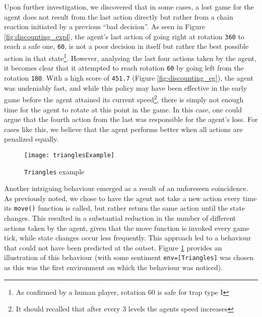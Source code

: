 Upon further investigation, we discovered that in some cases, a lost game for the agent does not result from the last action directly but rather from a chain reaction initiated by a previous ``bad decision''. As seen in Figure \ref{fig:discounting_expl}, the agent's last action of going right at rotation \texttt{360} to reach a safe one, \texttt{60}, is not a poor decision in itself but rather the best possible action in that state\footnote{As confirmed by a human player, rotation 60 is safe for trap type I}. However, analysing the last four actions taken by the agent, it becomes clear that it attempted to reach rotation \texttt{60} by going left from the rotation \texttt{180}. With a high score of \texttt{451.7} (Figure \ref{fig:discounting_eg}), the agent was undeniably fast, and while this policy may have been effective in the early game before the agent attained its current speed\footnote{It should recalled that after every 3 levels the agents speed increases}, there is simply not enough time for the agent to rotate at this point in the game. In this case, one could argue that the fourth action from the last was responsible for the agent's loss. For cases like this, we believe that the agent performs better when all actions are penalized equally.


\label{intbeh}
\begin{figure}[h]
    \centering
    \texttt{[image: trianglesExample]}
    \caption{\texttt{Triangles} example}
    \label{fig:triangles_eg}
\end{figure}

Another intriguing behaviour emerged as a result of an unforeseen coincidence. As previously noted, we chose to have the agent not take a new action every time its \texttt{move()} function is called, but rather return the same action until the state changes. This resulted in a substantial reduction in the number of different actions taken by the agent, given that the move function is invoked every game tick, while state changes occur less frequently. This approach led to a behaviour that could not have been predicted at the outset. Figure \ref{fig:triangles_eg} provides an illustration of this behaviour (with some sentiment \texttt{env=[Triangles]} was chosen as this was the first environment on which the behaviour was noticed).


